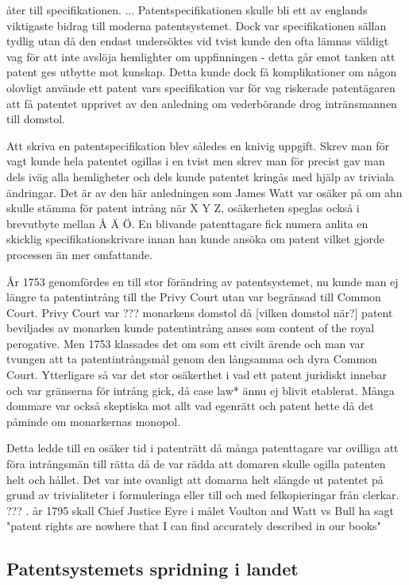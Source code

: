 åter till specifikationen. ... Patentspecifikationen skulle bli ett av englands viktigaste bidrag till
moderna patentsystemet. Dock var specifikationen sällan tydlig utan då den endast undersöktes vid tvist
kunde den ofta lämnas väldigt vag för att inte avslöja hemlighter om uppfinningen - detta går emot tanken
att patent ges utbytte mot kunskap. Detta kunde dock få komplikationer om någon olovligt använde ett
patent vars specifikation var för vag riskerade patentägaren att få patentet upprivet av den anledning om
vederbörande drog intränsmannen till domstol.

Att skriva en patentspecifikation blev således en knivig uppgift. Skrev man för vagt kunde hela patentet
ogillas i en tvist men skrev man för precist gav man dels iväg alla hemligheter och dels kunde patentet
kringås med hjälp av triviala ändringar. Det är av den här anledningen som James Watt var osäker på om
ahn skulle stämma för patent intrång när X Y Z, osäkerheten speglas också i brevutbyte mellan Å Ä Ö. En
blivande patenttagare fick numera anlita en skicklig specifikationskrivare innan han kunde ansöka om
patent vilket gjorde processen än mer omfattande.

År 1753 genomfördes en till stor förändring av patentsystemet, nu kunde man ej längre ta patentintrång
till the Privy Court utan var begränsad till Common Court. Privy Court var ??? monarkens domstol då
[vilken domstol när?] patent beviljades av monarken kunde patentintrång anses som content of the royal
perogative. Men 1753 klassades det om som ett civilt ärende och man var tvungen att ta patentintrångsmål
genom den långsamma och dyra Common Court. Ytterligare så var det stor osäkerthet i vad ett patent
juridiskt innebar och var gränserna för intrång gick, då case law* ännu ej blivit etablerat. Många
dommare var också skeptiska mot allt vad egenrätt och patent hette då det påminde om monarkernas monopol.

Detta ledde till en osäker tid i patenträtt då många patenttagare var ovilliga att föra intrångsmän till
rätta då de var rädda att domaren skulle ogilla patenten helt och hållet. Det var inte ovanligt att
domarna helt slängde ut patentet på grund av trivialiteter i formuleringa eller till och med
felkopieringar från clerkar. ??? . år 1795 skall Chief Justice Eyre i målet Voulton and Watt vs Bull ha
sagt "patent rights are nowhere that I can find accurately described in our books"


\subsection{Patentsystemets spridning i landet} %


